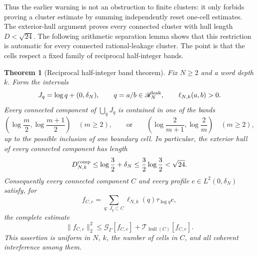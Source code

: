 \documentclass[11pt]{amsart}
\newtheorem{theorem}{Theorem}[section]
\theoremstyle{definition}
\theoremstyle{remark}
\begin{document}
Thus the earlier warning is not an obstruction to finite clusters: it only
forbids proving a cluster estimate by summing independently reset one-cell
estimates.  The exterior-hull argument proves every connected cluster with
hull length $D<\sqrt{24}$.  The following arithmetic separation lemma shows
that this restriction is automatic for every connected rational-leakage
cluster.  The point is that the cells respect a fixed family of reciprocal
half-integer bands.

\begin{theorem}[Reciprocal half-integer band theorem]
\label{thm:newdHalfIntegerBands}
Fix $N\geq2$ and a word depth $k$.  Form the intervals
\[
 J_q=\log q+(0,\delta_N),
 \qquad
 q=a/b\in\mathscr R_N^{\rm leak},
 \qquad \ell_{N,k}(a,b)>0.
\]
Every connected component of $\bigcup_qJ_q$ is contained in one of the
bands
\begin{equation}\label{eq:newdArithmeticBands}
 \left(\log\frac m2,\log\frac{m+1}{2}\right)
 \quad(m\geq2),
 \qquad\text{or}\qquad
 \left(\log\frac2{m+1},\log\frac2m\right)
 \quad(m\geq2),
\end{equation}
up to the possible inclusion of one boundary cell.  In particular, the
exterior hull of every connected component has length
\begin{equation}\label{eq:newdUniformClusterDiameter}
 D_{N,k}^{\rm comp}
 \leq \log\frac32+\delta_N
 \leq\frac32\log\frac32
 <\sqrt{24}.
\end{equation}
Consequently every connected component $C$ and every profile
$e\in L^2(0,\delta_N)$ satisfy, for
\[
 f_{C,e}=\sum_{q:\,J_q\subset C}
          \ell_{N,k}(q)\tau_{\log q}e,
\]
the complete estimate
\begin{equation}\label{eq:newdEveryConnectedClusterPaid}
 \|f_{C,e}\|_2^2
 \leq\mathcal G_\Gamma[f_{C,e}]
      +\mathcal T_{\operatorname{hull}(C)}[f_{C,e}].
\end{equation}
This assertion is uniform in $N$, $k$, the number of cells in $C$, and
all coherent interference among them.
\end{theorem}
\end{document}
